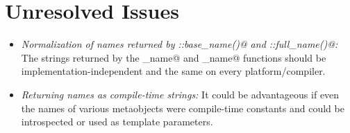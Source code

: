 \section{Unresolved Issues}

\begin{itemize}
	\item {\em Normalization of names returned by \verb@Named::base_name()@ and \verb@Named::full_name()@:}
	The strings returned by the \verb@base_name@ and \verb@full_name@ functions should be
	implementation-independent and the same on every platform/compiler.
	

	\item {\em Returning names as compile-time strings:} It could be advantageous if even
	the names of various metaobjects were compile-time constants and could be introspected
	or used as template parameters.
\end{itemize}
